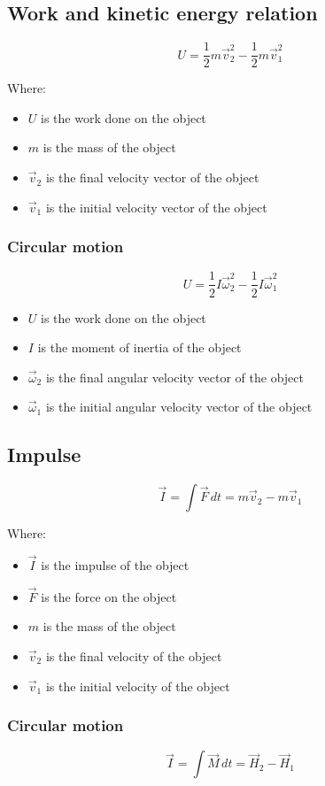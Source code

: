 \documentclass[11pt]{article}
\begin{document}
\subsection{Work and kinetic energy relation}
\label{sec:org52c8544}
\[U = \frac{1}{2} m \vec{v}_2^2 - \frac{1}{2} m \vec{v}_1^2\]

Where:
\begin{itemize}
\item \(U\) is the work done on the object
\item \(m\) is the mass of the object
\item \(\vec{v}_2\) is the final velocity vector of the object
\item \(\vec{v}_1\) is the initial velocity vector of the object
\end{itemize}
\subsubsection{Circular motion}
\label{sec:org4892c70}
\[U = \frac{1}{2} I \vec{\omega}_2^2 - \frac{1}{2} I \vec{\omega}_1^2\]

\begin{itemize}
\item \(U\) is the work done on the object
\item \(I\) is the moment of inertia of the object
\item \(\vec{\omega}_2\) is the final angular velocity vector of the object
\item \(\vec{\omega}_1\) is the initial angular velocity vector of the object
\end{itemize}
\subsection{Impulse}
\label{sec:orgba6ba81}
\[\vec{I} = \int \vec{F} \, dt = m \vec{v}_2 - m \vec{v}_1\]

Where:
\begin{itemize}
\item \(\vec{I}\) is the impulse of the object
\item \(\vec{F}\) is the force on the object
\item \(m\) is the mass of the object
\item \(\vec{v}_2\) is the final velocity of the object
\item \(\vec{v}_1\) is the initial velocity of the object
\end{itemize}
\subsubsection{Circular motion}
\label{sec:org03b7e7f}
\[\vec{I} = \int \vec{M} \, dt = \vec{H}_2 - \vec{H}_1\]
\end{document}
